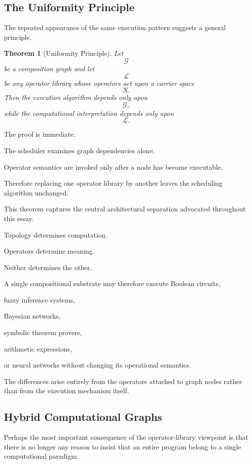 \documentclass[12pt,oneside]{article}
\newtheorem{theorem}[definition]{Theorem}
\begin{document}
\subsection{The Uniformity Principle}

The repeated appearance of the same execution pattern suggests a general principle.

\begin{theorem}[Uniformity Principle]
Let
\[
\mathcal G
\]
be a composition graph and let
\[
\mathcal L
\]
be any operator library whose operators act upon a carrier space
\[
X.
\]
Then the execution algorithm depends only upon
\[
\mathcal G,
\]
while the computational interpretation depends only upon
\[
\mathcal L.
\]
\end{theorem}

The proof is immediate.

The scheduler examines graph dependencies alone.

Operator semantics are invoked only after a node has become executable.

Therefore replacing one operator library by another leaves the scheduling algorithm unchanged.

This theorem captures the central architectural separation advocated throughout this essay.

Topology determines computation.

Operators determine meaning.

Neither determines the other.

A single compositional substrate may therefore execute Boolean circuits,

fuzzy inference systems,

Bayesian networks,

symbolic theorem provers,

arithmetic expressions,

or neural networks without changing its operational semantics.

The differences arise entirely from the operators attached to graph nodes rather than from the execution mechanism itself.

\subsection{Hybrid Computational Graphs}

Perhaps the most important consequence of the operator-library viewpoint is that there is no longer any reason to insist that an entire program belong to a single computational paradigm.
\end{document}
